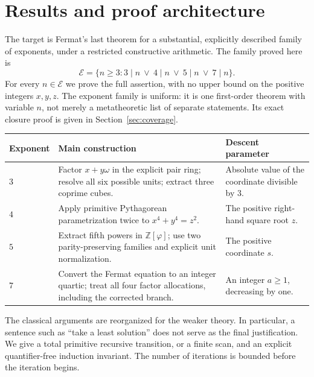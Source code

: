 \documentclass[11pt,letterpaper]{article}
\newcommand{\Z}{\mathbb Z}
\theoremstyle{remark}
\numberwithin{equation}{section}
\begin{document}
\tableofcontents
\clearpage
{}

\section{Results and proof architecture}

The target is Fermat's last theorem for a substantial, explicitly
described family of exponents, under a restricted constructive arithmetic.
The family proved here is
\[
 \mathcal E=\{n\geq3:3\mid n\ \vee\ 4\mid n\ \vee\ 5\mid n\ \vee\ 7\mid n\}.
\]
For every $n\in\mathcal E$ we prove the full assertion, with no upper
bound on the positive integers $x,y,z$. The exponent family is uniform:
it is one first-order theorem with variable $n$, not merely a metatheoretic
list of separate statements. Its exact closure proof is given in
Section~\ref{sec:coverage}.

\begin{center}
\begin{tabular}{>{\raggedright\arraybackslash}p{}>{\raggedright\arraybackslash}p{}>{\raggedright\arraybackslash}p{}}
\toprule
Exponent & Main construction & Descent parameter\\
\midrule
$3$ & Factor $x+y\omega$ in the explicit pair ring;
resolve all six possible units; extract three coprime cubes. &
Absolute value of the coordinate divisible by $3$.\\
$4$ & Apply primitive Pythagorean parametrization twice to
$x^4+y^4=z^2$. & The positive right-hand square root $z$.\\
$5$ & Extract fifth powers in $\Z[\varphi]$; use two parity-preserving
families and explicit unit normalization. & The positive coordinate $s$.\\
$7$ & Convert the Fermat equation to an integer quartic;
treat all four factor allocations, including the corrected branch. &
An integer $a\geq1$, decreasing by one.\\
\bottomrule
\end{tabular}
\end{center}

The classical arguments are reorganized for the weaker theory. In
particular, a sentence such as ``take a least solution'' does not serve as
the final justification. We give a total primitive recursive transition,
or a finite scan, and an explicit quantifier-free induction invariant.
The number of iterations is bounded before the iteration begins.
\end{document}
